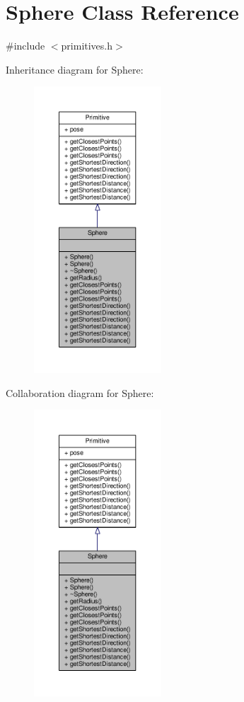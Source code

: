 \hypertarget{class_sphere}{}\section{Sphere Class Reference}
\label{class_sphere}


{\ttfamily \#include $<$primitives.\+h$>$}



Inheritance diagram for Sphere\+:\nopagebreak
\begin{figure}[H]
\begin{center}
\leavevmode
\includegraphics[width=135pt]{class_sphere__inherit__graph}
\end{center}
\end{figure}


Collaboration diagram for Sphere\+:\nopagebreak
\begin{figure}[H]
\begin{center}
\leavevmode
\includegraphics[width=135pt]{class_sphere__coll__graph}
\end{center}
\end{figure}
